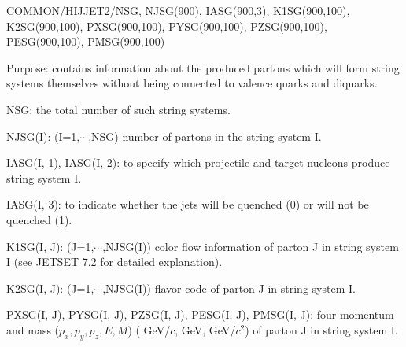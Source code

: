 \begin{description}
\itemsep=-4.0pt
\item{}COMMON/HIJJET2/NSG, NJSG(900), IASG(900,3), K1SG(900,100),\\
\hspace{-24pt}K2SG(900,100), PXSG(900,100), PYSG(900,100), PZSG(900,100), \\
\hspace{-24pt}PESG(900,100), PMSG(900,100)
\item{}Purpose: contains information about the produced partons which
                will form string systems themselves without being 
                connected to valence quarks and diquarks.
\item{}NSG: the total number of such string systems.
\item{}NJSG(I): (I=1,$\cdots$,NSG) number of partons in the string system I.
\item{}IASG(I, 1), IASG(I, 2): to specify which projectile and target 
                nucleons produce string system I.
\item{}IASG(I, 3): to indicate whether the jets will be quenched (0)
                or will not be quenched (1).
\item{}K1SG(I, J): (J=1,$\cdots$,NJSG(I)) color flow information of parton J
                in string system I (see JETSET 7.2 for detailed
                explanation).
\item{}K2SG(I, J): (J=1,$\cdots$,NJSG(I)) flavor code of parton J in string
                system I.
\item{}PXSG(I, J), PYSG(I, J), PZSG(I, J), PESG(I, J), PMSG(I, J): four
                momentum and mass ($p_x,p_y,p_z,E,M$) 
                ( GeV/$c$, GeV, GeV/$c^2$) of parton J in string system I. 
\end{description}


